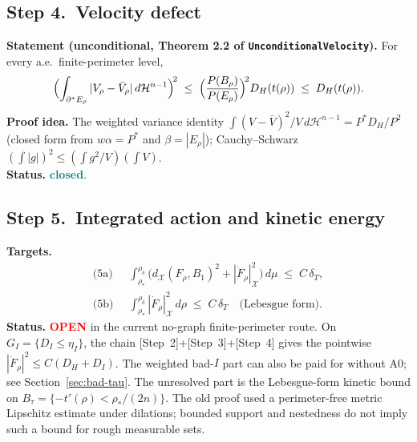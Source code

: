 \documentclass[11pt]{article}
\theoremstyle{definition}
\newcommand{\X}{\mathcal X}
\newcommand{\rstar}{\rho_{*}}
\newcommand{\rdel}{\rho_\delta}
\newcommand{\Hn}{\mathcal H^{n-1}}
\newcommand{\OPEN}{\textcolor{red}{\bf OPEN}}
\newcommand{\CLOSED}{\textcolor{teal}{\bf closed}}
\begin{document}
\subsection*{Step 4.\ Velocity defect}\label{step:4}
\textbf{Statement (unconditional, Theorem 2.2 of \texttt{UnconditionalVelocity}).}
For every a.e.\ finite-perimeter level,
\[
   \Bigl(\int_{\partial^{*}E_{\rho}}|V_{\rho}-\bar V_{\rho}|\,d\Hn\Bigr)^{\!2}
   \;\le\; \Bigl(\frac{P(B_{\rho})}{P(E_{\rho})}\Bigr)^{\!2} D_{H}(t(\rho))
   \;\le\; D_{H}(t(\rho)).
\]
\textbf{Proof idea.}  The weighted variance identity
$\int(V-\bar V)^{2}/V\,d\Hn=P^{*}D_{H}/P^{2}$ (closed form from
$w\alpha=P^{*}$ and $\beta=|E_{\rho}|$); Cauchy--Schwarz
$(\int|g|)^{2}\le(\int g^{2}/V)(\int V)$.\\
\textbf{Status.}  \CLOSED.

\subsection*{Step 5.\ Integrated action and kinetic energy}\label{step:5}
\textbf{Targets.}
\begin{align*}
   \text{(5a)}&\;\;\int_{\rstar}^{\rdel}\bigl(d_{\X}(F_{\rho},B_{1})^{2}+|\dot F_{\rho}|_{\X}^{2}\bigr)\,d\mu
      \;\le\; C\,\delta_{T},\\
   \text{(5b)}&\;\;\int_{\rstar}^{\rdel}|\dot F_{\rho}|_{\X}^{2}\,d\rho
      \;\le\; C\,\delta_{T}\quad\text{(Lebesgue form)}.
\end{align*}
\textbf{Status.}  \OPEN{} in the current no-graph finite-perimeter
route.  On $G_{I}=\{D_{I}\le\eta_{I}\}$, the chain
[Step~2]+[Step~3]+[Step~4] gives the pointwise
$|\dot F_{\rho}|^{2}\le C(D_{H}+D_{I})$.  The weighted bad-$I$ part can
also be paid for without A0; see Section~\ref{sec:bad-tau}.  The
unresolved part is the Lebesgue-form kinetic bound on
$B_{\tau}=\{-t'(\rho)<\rho_{*}/(2n)\}$.  The old proof used a
perimeter-free metric Lipschitz estimate under dilations; bounded
support and nestedness do not imply such a bound for rough measurable
sets.
\end{document}
